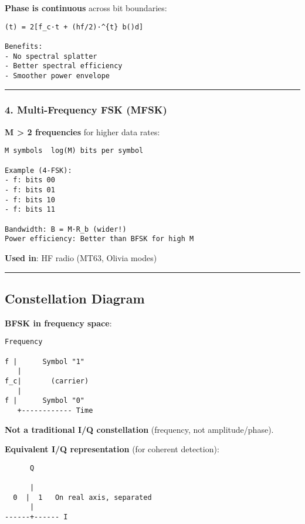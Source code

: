 \textbf{Phase is continuous} across bit boundaries:

\begin{verbatim}
(t) = 2[f_c·t + (hf/2)·^{t} b()d]

Benefits:
- No spectral splatter
- Better spectral efficiency
- Smoother power envelope
\end{verbatim}

\begin{center}\rule{0.5\linewidth}{0.5pt}\end{center}

\subsubsection{4. Multi-Frequency FSK
(MFSK)}\label{multi-frequency-fsk-mfsk}

\textbf{M \textgreater{} 2 frequencies} for higher data rates:

\begin{verbatim}
M symbols  log(M) bits per symbol

Example (4-FSK):
- f: bits 00
- f: bits 01
- f: bits 10
- f: bits 11

Bandwidth: B = M·R_b (wider!)
Power efficiency: Better than BFSK for high M
\end{verbatim}

\textbf{Used in}: HF radio (MT63, Olivia modes)

\begin{center}\rule{0.5\linewidth}{0.5pt}\end{center}

\subsection{\texorpdfstring{ Constellation
Diagram}{ Constellation Diagram}}\label{constellation-diagram}

\textbf{BFSK in frequency space}:

\begin{verbatim}
Frequency
   
f |      Symbol "1"
   |
f_c|       (carrier)
   |
f |      Symbol "0"
   +------------ Time
\end{verbatim}

\textbf{Not a traditional I/Q constellation} (frequency, not
amplitude/phase).

\textbf{Equivalent I/Q representation} (for coherent detection):

\begin{verbatim}
      Q
      
      |
  0  |  1   On real axis, separated
      |
------+------ I
\end{verbatim}

